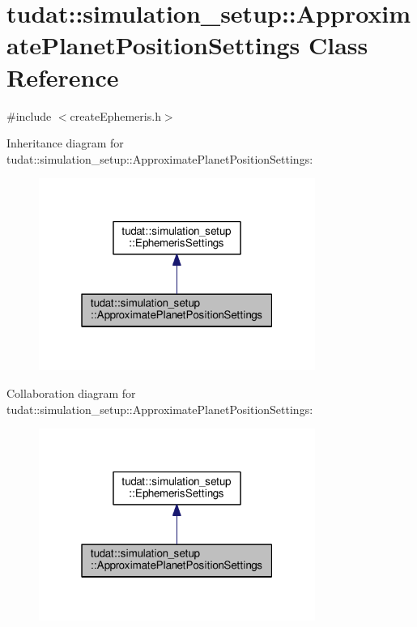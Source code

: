 \hypertarget{classtudat_1_1simulation__setup_1_1ApproximatePlanetPositionSettings}{}\section{tudat\+:\+:simulation\+\_\+setup\+:\+:Approximate\+Planet\+Position\+Settings Class Reference}
\label{classtudat_1_1simulation__setup_1_1ApproximatePlanetPositionSettings}


{\ttfamily \#include $<$create\+Ephemeris.\+h$>$}



Inheritance diagram for tudat\+:\+:simulation\+\_\+setup\+:\+:Approximate\+Planet\+Position\+Settings\+:
\nopagebreak
\begin{figure}[H]
\begin{center}
\leavevmode
\includegraphics[width=256pt]{classtudat_1_1simulation__setup_1_1ApproximatePlanetPositionSettings__inherit__graph}
\end{center}
\end{figure}


Collaboration diagram for tudat\+:\+:simulation\+\_\+setup\+:\+:Approximate\+Planet\+Position\+Settings\+:
\nopagebreak
\begin{figure}[H]
\begin{center}
\leavevmode
\includegraphics[width=256pt]{classtudat_1_1simulation__setup_1_1ApproximatePlanetPositionSettings__coll__graph}
\end{center}
\end{figure}
